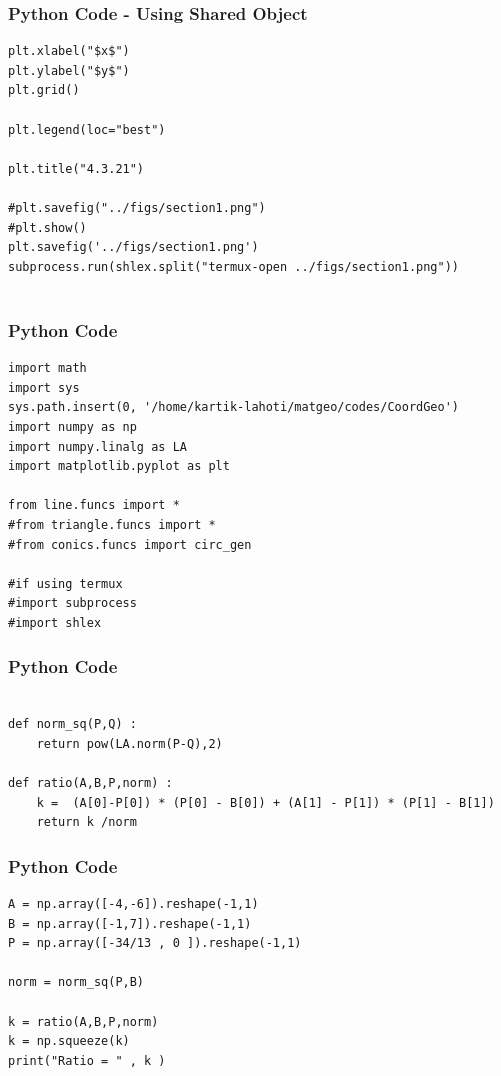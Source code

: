 \documentclass{beamer}
\begin{document}
\begin{frame}[fragile]
    \frametitle{Python Code - Using Shared Object}
    \begin{lstlisting}
plt.xlabel("$x$")
plt.ylabel("$y$")
plt.grid()

plt.legend(loc="best")

plt.title("4.3.21")

#plt.savefig("../figs/section1.png")
#plt.show()
plt.savefig('../figs/section1.png')
subprocess.run(shlex.split("termux-open ../figs/section1.png"))


\end{lstlisting}
\end{frame}

\begin{frame}[fragile]
    \frametitle{Python Code}
    \begin{lstlisting}
import math
import sys 
sys.path.insert(0, '/home/kartik-lahoti/matgeo/codes/CoordGeo')
import numpy as np
import numpy.linalg as LA
import matplotlib.pyplot as plt

from line.funcs import *
#from triangle.funcs import *
#from conics.funcs import circ_gen

#if using termux
#import subprocess
#import shlex
\end{lstlisting}
\end{frame}

\begin{frame}[fragile]
    \frametitle{Python Code }
    \begin{lstlisting}

def norm_sq(P,Q) :
    return pow(LA.norm(P-Q),2)

def ratio(A,B,P,norm) :
    k =  (A[0]-P[0]) * (P[0] - B[0]) + (A[1] - P[1]) * (P[1] - B[1])
    return k /norm 

\end{lstlisting}
\end{frame}

\begin{frame}[fragile]
    \frametitle{Python Code }
    \begin{lstlisting}
A = np.array([-4,-6]).reshape(-1,1)
B = np.array([-1,7]).reshape(-1,1)
P = np.array([-34/13 , 0 ]).reshape(-1,1)

norm = norm_sq(P,B)

k = ratio(A,B,P,norm) 
k = np.squeeze(k) 
print("Ratio = " , k )
\end{lstlisting}
\end{frame}
\end{document}
